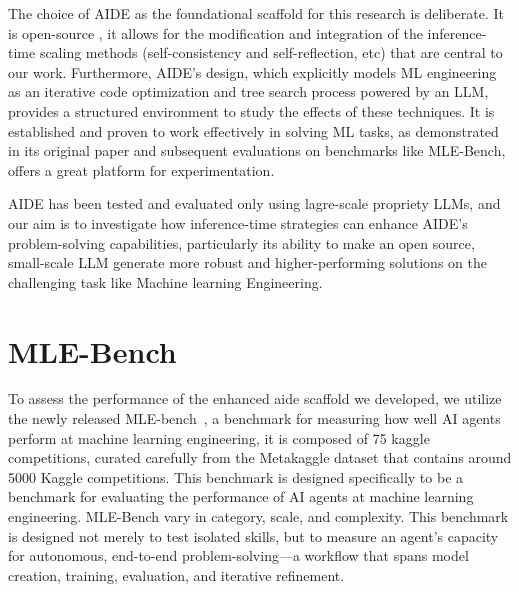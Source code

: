 The choice of AIDE as the foundational scaffold for this research is deliberate. It is open-source , it allows for the modification and integration of the inference-time scaling methods (self-consistency and self-reflection, etc) that are central to our work. Furthermore, AIDE's design, which explicitly models ML engineering as an iterative code optimization and tree search process powered by an LLM, provides a structured environment to study the effects of these techniques. It is established and proven to work effectively in solving ML tasks, as demonstrated in its original paper and subsequent evaluations on benchmarks like MLE-Bench, offers a great platform for experimentation. 

AIDE has been tested and evaluated only using lagre-scale propriety LLMs, and our aim is to investigate how inference-time strategies can enhance AIDE's problem-solving capabilities, particularly its ability to make an open source, small-scale LLM generate more robust and higher-performing solutions on the challenging task like Machine learning Engineering.


\section{MLE-Bench}
To assess the performance of the enhanced aide scaffold we developed, we utilize the newly released MLE-bench~\cite{mle-bench}, a benchmark for measuring how well AI agents perform at machine learning engineering, it is composed of 75 kaggle competitions, curated carefully from the Metakaggle dataset that contains around 5000 Kaggle competitions.
This benchmark is designed specifically to be a benchmark for evaluating the performance of AI agents at machine learning engineering. MLE-Bench vary in category, scale, and complexity. This benchmark is designed not merely to test isolated skills, but to measure an agent's capacity for autonomous, end-to-end problem-solving—a workflow that spans model creation, training, evaluation, and iterative refinement.

